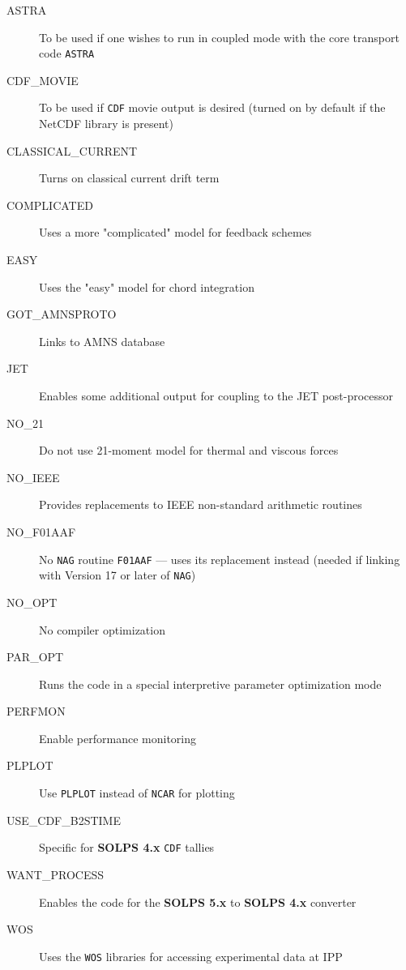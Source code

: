 \documentclass[a4paper,10pt]{report}
\newcommand\SOLPSfour{{\bf SOLPS 4.x} }
\newcommand\SOLPSfive{{\bf SOLPS 5.x} }
\begin{document}
\begin{description}
\item[ASTRA]  To be used if one wishes to run in coupled mode with the core transport code {\tt ASTRA}
\item[CDF\_MOVIE]  To be used if {\tt CDF} movie output is desired (turned on by default if the NetCDF library is present)
\item[CLASSICAL\_CURRENT]  Turns on classical current drift term
\item[COMPLICATED]  Uses a more "complicated" model for feedback schemes
\item[EASY]  Uses the "easy" model for chord integration
\item[GOT\_AMNSPROTO]  Links to AMNS database
\item[JET]  Enables some additional output for coupling to the JET post-processor
\item[NO\_21]  Do not use 21-moment model for thermal and viscous forces
\item[NO\_IEEE]  Provides replacements to IEEE non-standard arithmetic routines
\item[NO\_F01AAF]  No {\tt NAG} routine {\tt F01AAF} --- uses its replacement instead (needed if linking with Version 17 or later of {\tt NAG})
\item[NO\_OPT]  No compiler optimization
\item[PAR\_OPT]  Runs the code in a special interpretive parameter optimization mode
\item[PERFMON]  Enable performance monitoring
\item[PLPLOT]  Use {\tt PLPLOT} instead of {\tt NCAR} for plotting
\item[USE\_CDF\_B2STIME]  Specific for \SOLPSfour {\tt CDF} tallies
\item[WANT\_PROCESS]  Enables the code for the \SOLPSfive to \SOLPSfour converter
\item[WOS]  Uses the {\tt WOS} libraries for accessing experimental data at IPP
\end{description}
\end{document}
